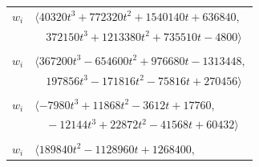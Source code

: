 \documentclass[11pt]{article}
\begin{document}
\begin{longtable}{@{}ll@{}}
$w_i$ & $\langle 40320t^{3}+772320t^{2}+1540140t+636840,$\\
 & $\quad 372150t^{3}+1213380t^{2}+735510t-4800\rangle$\\
\addlinespace[2pt]
\multicolumn{2}{@{}p{0.97\textwidth}@{}}{$i=16$, $D_i=1$, $\rho_{ij}$: $0{:}2, \allowbreak 8{:}1, \allowbreak 9{:}2, \allowbreak 10{:}2, \allowbreak 13{:}2, \allowbreak 14{:}1, \allowbreak 19{:}2, \allowbreak 24{:}1, \allowbreak 25{:}2, \allowbreak 26{:}2, \allowbreak 30{:}1, \allowbreak 33{:}2, \allowbreak 36{:}2, \allowbreak 37{:}2, \allowbreak 38{:}2, \allowbreak 40{:}2, \allowbreak 41{:}1, \allowbreak 43{:}1, \allowbreak 44{:}2, \allowbreak 57{:}1, \allowbreak 59{:}1, \allowbreak 60{:}2, \allowbreak 68{:}2, \allowbreak 73{:}2, \allowbreak 76{:}2, \allowbreak 78{:}2$}\\
$w_i$ & $\langle 367200t^{3}-654600t^{2}+976680t-1313448,$\\
 & $\quad 197856t^{3}-171816t^{2}-75816t+270456\rangle$\\
\addlinespace[2pt]
\multicolumn{2}{@{}p{0.97\textwidth}@{}}{$i=17$, $D_i=1$, $\rho_{ij}$: $0{:}1, \allowbreak 9{:}1, \allowbreak 15{:}1, \allowbreak 18{:}1, \allowbreak 22{:}1, \allowbreak 24{:}1, \allowbreak 27{:}1, \allowbreak 31{:}2, \allowbreak 34{:}1, \allowbreak 36{:}1, \allowbreak 37{:}1, \allowbreak 39{:}1, \allowbreak 42{:}2, \allowbreak 61{:}1, \allowbreak 67{:}2, \allowbreak 68{:}1, \allowbreak 69{:}1, \allowbreak 71{:}1, \allowbreak 72{:}2, \allowbreak 78{:}2, \allowbreak 79{:}1, \allowbreak 84{:}1, \allowbreak 85{:}2, \allowbreak 86{:}1, \allowbreak 93{:}2, \allowbreak 95{:}2$}\\
$w_i$ & $\langle -7980t^{3}+11868t^{2}-3612t+17760,$\\
 & $\quad -12144t^{3}+22872t^{2}-41568t+60432\rangle$\\
\addlinespace[2pt]
\multicolumn{2}{@{}p{0.97\textwidth}@{}}{$i=18$, $D_i=1$, $\rho_{ij}$: $3{:}2, \allowbreak 6{:}1, \allowbreak 8{:}1, \allowbreak 11{:}1, \allowbreak 17{:}2, \allowbreak 21{:}2, \allowbreak 23{:}1, \allowbreak 30{:}2, \allowbreak 31{:}2, \allowbreak 38{:}1, \allowbreak 39{:}2, \allowbreak 41{:}2, \allowbreak 43{:}1, \allowbreak 53{:}2, \allowbreak 56{:}2, \allowbreak 60{:}2, \allowbreak 61{:}1, \allowbreak 62{:}1, \allowbreak 63{:}1, \allowbreak 65{:}2, \allowbreak 68{:}1, \allowbreak 72{:}1, \allowbreak 81{:}1, \allowbreak 86{:}1, \allowbreak 87{:}1, \allowbreak 89{:}1, \allowbreak 96{:}1$}\\
$w_i$ & $\langle 189840t^{2}-1128960t+1268400,$\\

\end{longtable}
\end{document}
